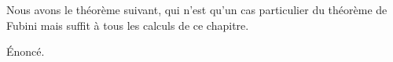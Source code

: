 Nous avons le théorème suivant, qui n'est qu'un cas particulier du théorème de
Fubini mais suffit à tous les calculs de ce chapitre.
\begin{theorem}
  Énoncé.
\end{theorem}
